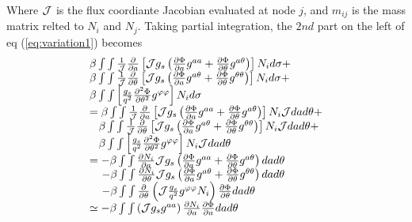 \documentclass{report}
\newcommand{\ff}[2]{\frac{#1}{#2}}
\newcommand{\pp}[2]{\frac{\partial{#1}}{\partial{#2}}}
\newcommand{\psp}[2]{\frac{\partial^2{#1}}{\partial{#2}^2}}
\begin{document}
Where ${\cal J}$ is the flux coordiante Jacobian evaluated at node $j$,
and $m_{ij}$ is the mass matrix relted to $N_i$ and $N_j$.
Taking partial integration, the $2nd$ part on the left of eq (\ref{eq:variation1}) becomes
\begin{equation}
\label{eq:variation4}
\begin{array}{l}
\beta \int\int \ff{1}{\cal J} \pp{}{a} \left[
      {\cal J} g_s \left( 
           \pp{\Phi}{a} g^{a a} + \pp{\Phi}{\theta} g^{a \theta}
                            \right)
                              \right] N_i d\sigma
+\\
\beta \int\int \ff{1}{\cal J} \pp{}{\theta} \left[
      {\cal J} g_s \left( 
           \pp{\Phi}{a} g^{a \theta} + \pp{\Phi}{\theta} g^{\theta \theta}
                                 \right)
                              \right] N_i d\sigma
+\\
\beta \int\int \left[
      \ff{g_s}{q^2} \psp{\Phi}{\theta} g^{\varphi \varphi}
               \right] N_i d\sigma
 \\
=
\beta \int\int \ff{1}{\cal J} \pp{}{a} \left[
      {\cal J} g_s \left( 
           \pp{\Phi}{a} g^{a a} + \pp{\Phi}{\theta} g^{a \theta}
                            \right)
                              \right] N_i  {\cal J} dad\theta
+\\
\;\;\;
\beta \int\int \ff{1}{\cal J} \pp{}{\theta} \left[
      {\cal J} g_s \left( 
           \pp{\Phi}{a} g^{a \theta} + \pp{\Phi}{\theta} g^{\theta \theta}
                                 \right)
                              \right] N_i  {\cal J} dad\theta
+\\
\;\;\;
\beta \int\int \left[
      \ff{g_s}{q^2} \psp{\Phi}{\theta} g^{\varphi \varphi}
               \right] N_i  {\cal J} dad\theta
\\
=
- \beta \int\int 
      \pp{N_i}{a} {\cal J} g_s \left( 
           \pp{\Phi}{a} g^{a a} + \pp{\Phi}{\theta} g^{a \theta}
                               \right) dad\theta
\\
\;\;\;\;
- \beta \int\int 
      \pp{N_i}{\theta} {\cal J} g_s \left( 
           \pp{\Phi}{a} g^{a \theta} + \pp{\Phi}{\theta} g^{\theta \theta}
                                    \right) dad\theta
\\
\;\;\;\;
- \beta \int\int 
      \pp{ }{\theta}\left(
                          {\cal J}\ff{g_s}{q^2} g^{\varphi \varphi} N_i
                    \right)
      \pp{\Phi}{\theta} dad\theta
\\
\simeq
- \beta \int\int \left( {\cal J} g_s g^{a a} \right)
                 \pp{N_i}{a} \pp{\Phi}{a} dad\theta

\end{array}
\end{equation}
\end{document}

